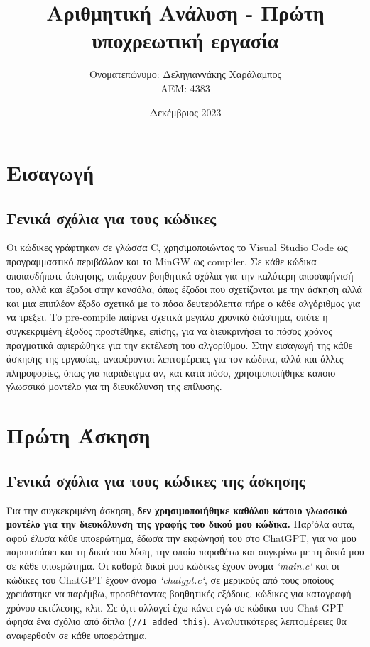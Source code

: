 \documentclass[a4paper, 14pt]{article}   %
\title{Αριθμητική Ανάλυση - Πρώτη υποχρεωτική εργασία}   %
\author{Ονοματεπώνυμο: Δεληγιαννάκης Χαράλαμπος \\ ΑΕΜ: 4383}   %
\date{Δεκέμβριος 2023}   %
\begin{document}

\maketitle   %

\section*{Εισαγωγή}   %

\subsection*{Γενικά σχόλια για τους κώδικες}   %
	Οι κώδικες γράφτηκαν σε γλώσσα C, χρησιμοποιώντας το Visual Studio Code ως προγραμμαστικό περιβάλλον και το MinGW ως compiler. Σε κάθε κώδικα οποιασδήποτε άσκησης, υπάρχουν βοηθητικά σχόλια 	για την καλύτερη αποσαφήνισή του, αλλά και έξοδοι στην κονσόλα, όπως έξοδοι που σχετίζονται με την άσκηση αλλά και μια επιπλέον έξοδο σχετικά με το πόσα δευτερόλεπτα πήρε ο κάθε αλγόριθμος για να τρέξει. Το pre-compile παίρνει σχετικά μεγάλο χρονικό διάστημα, οπότε η συγκεκριμένη έξοδος προστέθηκε, επίσης, για να διευκρινήσει το πόσος χρόνος πραγματικά αφιερώθηκε για την εκτέλεση του αλγορίθμου. Στην εισαγωγή της κάθε άσκησης της εργασίας, αναφέρονται λεπτομέρειες για τον κώδικα, αλλά και άλλες πληροφορίες, όπως για παράδειγμα αν, και κατά πόσο, χρησιμοποιήθηκε κάποιο γλωσσικό μοντέλο για τη διευκόλυνση της επίλυσης.


\section*{Πρώτη Άσκηση}   %

\subsection*{Γενικά σχόλια για τους κώδικες της άσκησης}   %
	Για την συγκεκριμένη άσκηση, \textbf{δεν χρησιμοποιήθηκε καθόλου κάποιο γλωσσικό μοντέλο για την διευκόλυνση της γραφής του δικού μου κώδικα.} Παρ'όλα αυτά, αφού έλυσα κάθε υποερώτημα, έδωσα την εκφώνησή του στο ChatGPT, για να μου παρουσιάσει και τη δικιά του λύση, την οποία παραθέτω και συγκρίνω με τη δικιά μου σε κάθε υποερώτημα. Οι καθαρά δικοί μου κώδικες έχουν όνομα \emph{`main.c`} και οι κώδικες του ChatGPT έχουν όνομα \emph{`chatgpt.c`}, σε μερικούς από τους οποίους χρειάστηκε να παρέμβω, προσθέτοντας βοηθητικές εξόδους, κώδικες για καταγραφή χρόνου εκτέλεσης, κλπ. Σε ό,τι αλλαγεί έχω κάνει εγώ σε κώδικα του Chat GPT άφησα ένα σχόλιο από δίπλα (\texttt{//I added this}). Αναλυτικότερες λεπτομέρειες θα αναφερθούν σε κάθε υποερώτημα.
\end{document}
